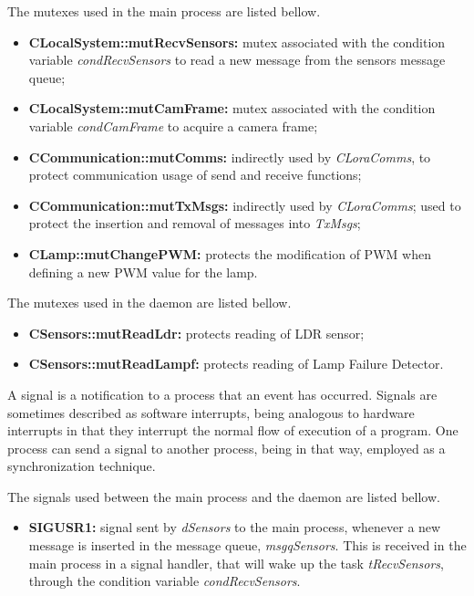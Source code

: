 \clearpage
The mutexes used in the main process are listed bellow.

\begin{itemize}
	\item \textbf{CLocalSystem::mutRecvSensors:} mutex associated with the condition variable \textit{condRecvSensors} to read a new message from the sensors message queue;

	\item \textbf{CLocalSystem::mutCamFrame:} mutex associated with the condition variable \textit{condCamFrame} to acquire a camera frame;

	\item \textbf{CCommunication::mutComms:} indirectly used by \textit{CLoraComms}, to protect communication usage of send and receive functions;

	\item \textbf{CCommunication::mutTxMsgs:} indirectly used by \textit{CLoraComms}; used to protect the insertion and removal of messages into \textit{TxMsgs};

	\item \textbf{CLamp::mutChangePWM:} protects the modification of PWM when defining a new PWM value for the lamp.
\end{itemize}

The mutexes used in the daemon are listed bellow.

\begin{itemize}
	\item \textbf{CSensors::mutReadLdr:} protects reading of LDR sensor;
	\item \textbf{CSensors::mutReadLampf:} protects reading of Lamp Failure Detector.
\end{itemize}


A signal is a notification to a process that an event has occurred. Signals are sometimes described as software interrupts, being analogous to hardware interrupts in that they interrupt the normal flow of execution of a program. One process can send a signal to another process, being in that way, employed as a synchronization technique.

The signals used between the main process and the daemon are listed bellow.

\begin{itemize}
	\item \textbf{SIGUSR1:}	signal sent by \textit{dSensors} to the main process, whenever a new message is inserted in the message queue, \textit{msgqSensors}. This is received in the main process in a signal handler, that will wake up the task \textit{tRecvSensors}, through the condition variable \textit{condRecvSensors}.
\end{itemize}

